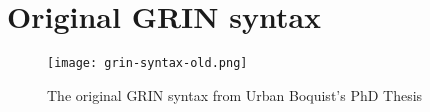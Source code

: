 \documentclass[main.tex]{subfiles}
\begin{document}
	
	\section{Original GRIN syntax}
	\begin{figure}[H]
		\centering
		\texttt{[image: grin-syntax-old.png]}
		\caption{The original GRIN syntax from Urban Boquist's PhD Thesis}
		\label{fig:grin-syntax-old}
	\end{figure}
	
\end{document}
